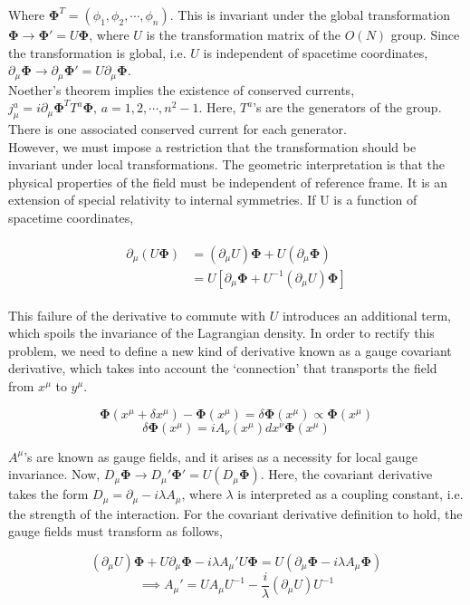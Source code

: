 \noindent Where $\boldsymbol\Phi^T=(\phi_1,\phi_2,\cdots,\phi_n)$. This is invariant under the global transformation $\boldsymbol\Phi\rightarrow\boldsymbol\Phi'= U\boldsymbol\Phi$, where $U$ is the transformation matrix of the $O(N)$ group. Since the transformation is global, i.e. $U$ is independent of spacetime coordinates, $\partial_\mu\boldsymbol\Phi\rightarrow\partial_\mu\boldsymbol\Phi'= U\partial_\mu\boldsymbol\Phi$.\\

\noindent Noether's theorem implies the existence of conserved currents, $j_\mu^a=i\partial_\mu\boldsymbol\Phi^T T^a\boldsymbol\Phi, \,a=1,2,\cdots ,n^2-1$. Here, $T^a$'s are the generators of the group. There is one associated conserved current for each generator.\\

\noindent However, we must impose a restriction that the transformation should be invariant under local transformations. The geometric interpretation is that the physical properties of the field must be independent of reference frame. It is an extension of special relativity to internal symmetries. If U is a function of spacetime coordinates, 

\begin{align*}
    \begin{split}
        \partial_\mu(U\boldsymbol\Phi)&=(\partial_\mu U)\boldsymbol\Phi+U(\partial_\mu\boldsymbol\Phi)\\
        &=U[\partial_\mu\boldsymbol\Phi+U^{-1}(\partial_\mu U)\boldsymbol\Phi]
    \end{split}
\end{align*}

\noindent This failure of the derivative to commute with $U$ introduces an additional term, which spoils the invariance of the Lagrangian density. In order to rectify this problem, we need to define a new kind of derivative known as a gauge covariant derivative, which takes into account the `connection' that transports the field from $x^\mu$ to $y^\mu$.

$$\boldsymbol\Phi(x^\mu+\delta x^\mu)-\boldsymbol\Phi(x^\mu)=\delta\boldsymbol\Phi(x^\mu)\propto\boldsymbol\Phi(x^\mu)$$
$$\delta\boldsymbol\Phi(x^\mu)=iA_\nu(x^\mu)dx^\nu\boldsymbol\Phi(x^\mu)$$

\noindent $A^\mu$'s are known as gauge fields, and it arises as a necessity for local gauge invariance. Now, $D_\mu\boldsymbol\Phi \rightarrow D_\mu'\boldsymbol\Phi'=U(D_\mu\boldsymbol\Phi)$. Here, the covariant derivative takes the form $D_\mu=\partial_\mu -i\lambda A_\mu$, where $\lambda$ is interpreted as a coupling constant, i.e. the strength of the interaction. For the covariant derivative definition to hold, the gauge fields must transform as follows,

$$(\partial_\mu U)\boldsymbol\Phi+U\partial_\mu\boldsymbol\Phi -i\lambda A_\mu'U\boldsymbol\Phi=U(\partial_\mu\boldsymbol\Phi -i\lambda A_\mu\boldsymbol\Phi)$$
$$\implies A_\mu'=UA_\mu U^{-1}-\frac{i}{\lambda}(\partial_\mu U)U^{-1}$$
